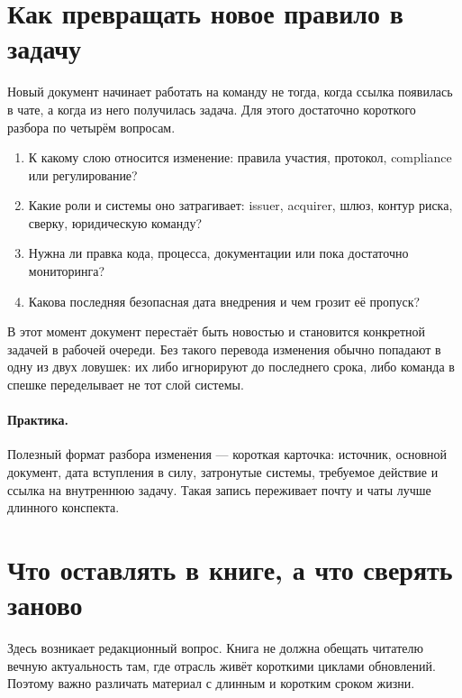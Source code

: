 \section{Как превращать новое правило в задачу}
\label{sec:ps-tracking-triage}

Новый документ начинает работать на команду не тогда, когда ссылка
появилась в чате, а когда из него получилась задача. Для этого
достаточно короткого разбора по четырём вопросам.

\begin{enumerate}
  \item К какому слою относится изменение: правила участия, протокол,
        compliance или регулирование?
  \item Какие роли и системы оно затрагивает: issuer, acquirer,
        шлюз, контур риска, сверку, юридическую команду?
  \item Нужна ли правка кода, процесса, документации или пока
        достаточно мониторинга?
  \item Какова последняя безопасная дата внедрения и чем грозит
        её пропуск?
\end{enumerate}

В этот момент документ перестаёт быть новостью и становится
конкретной задачей в рабочей очереди. Без такого перевода изменения
обычно попадают в одну из двух ловушек: их либо игнорируют
до последнего срока, либо команда в спешке переделывает
не тот слой системы.

\paragraph{Практика.}
Полезный формат разбора изменения --- короткая карточка: источник, основной документ, дата вступления в силу, затронутые системы, требуемое действие и ссылка на внутреннюю задачу. Такая запись переживает почту и чаты лучше длинного конспекта.


\section{Что оставлять в книге, а что сверять заново}
\label{sec:ps-tracking-book-vs-reference}

Здесь возникает редакционный вопрос. Книга не должна обещать
читателю вечную актуальность там, где отрасль живёт короткими
циклами обновлений. Поэтому важно различать материал
с длинным и коротким сроком жизни.

